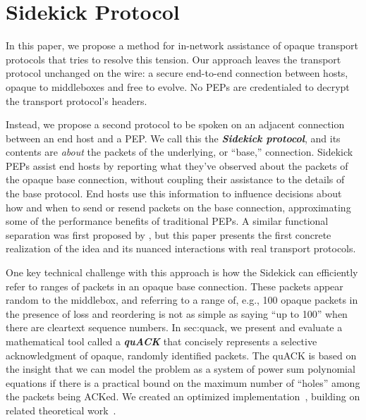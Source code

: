 \chapter{Sidekick Protocol}

In this paper, we propose a method for in-network assistance of opaque transport
protocols that tries to resolve this tension. Our approach leaves the transport
protocol unchanged on the wire: a secure end-to-end connection between hosts,
opaque to middleboxes and free to evolve. No PEPs are credentialed to decrypt
the transport protocol's headers.

Instead, we propose a second protocol to be spoken on an adjacent connection
between an end host and a PEP. We call this the \emph{\bf Sidekick protocol},
and its contents are \emph{about} the packets of the underlying, or ``base,''
connection. Sidekick PEPs assist end hosts by reporting what they've observed
about the packets of the opaque base connection, without coupling their
assistance to the details of the base protocol. End hosts use this information
to influence decisions about how and when to send or resend packets on the base
connection, approximating some of the performance benefits of traditional PEPs.
A similar functional separation was first proposed by \cite
{yuan2022sidecar}, but this paper presents the first concrete realization of
the idea and its nuanced interactions with real transport protocols.

One key technical challenge with this approach is how the Sidekick can
efficiently refer to ranges of packets in an opaque base connection. These
packets appear random to the middlebox, and referring to a range of, e.g., 100
opaque packets in the presence of loss and reordering is not as simple as
saying ``up to 100'' when there are cleartext sequence numbers. In \Cref
{sec:quack}, we present and evaluate a mathematical tool called a \emph
{\bf quACK} that concisely represents a selective acknowledgment of opaque,
randomly identified packets. The quACK is based on the insight that we can
model the problem as a system of power sum polynomial equations if there is a
practical bound on the maximum number of ``holes'' among the packets being
ACKed. We created an optimized implementation~\cite{quack-github}, building on
related theoretical work~\cite
{eppstein2011straggler,minsky2003set,karpovsky2003data}.

